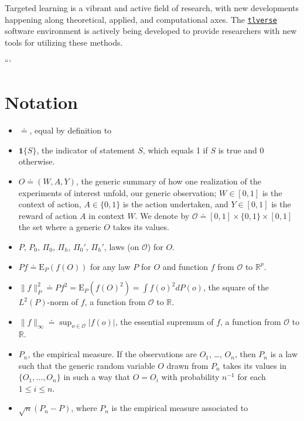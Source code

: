 \documentclass[11pt,openright,twoside]{book}
\newcommand{\bbR}{\mathbb{R}}
\newcommand{\defq}{\doteq}
\newcommand{\calO}{\mathcal{O}}
\newcommand{\Exp}{\textrm{E}}
\newcommand{\one}{\textbf{1}}
\theoremstyle{definition}
\theoremstyle{definition}
\theoremstyle{definition}
\theoremstyle{remark}
\begin{document}
Targeted learning is a vibrant and active field of research, with new
developments happening along theoretical, applied, and computational axes. The
\href{https://tlverse.org/}{\texttt{tlverse}} software environment is actively being
developed to provide researchers with new tools for utilizing these methods.

\hypertarget{appendix-appendix}{%
\appendix}


```

\hypertarget{notation}{%
\chapter{Notation}\label{notation}}

\begin{itemize}
\item
  \(\defq\), equal by definition to
\item
  \(\one\{S\}\), the indicator of statement \(S\), which equals 1 if \(S\) is true
  and 0 otherwise.
\item
  \(O \defq (W,A,Y)\), the generic summary of how one realization of the experiments
  of interest unfold, our generic observation; \(W \in [0,1]\) is the context of
  action, \(A \in \{0,1\}\) is the action undertaken, and \(Y\in [0,1]\) is the
  reward of action \(A\) in context \(W\). We denote by \(\calO \defq [0,1] \times \{0,1\} \times [0,1]\) the set where a generic \(O\) takes its values.
\item
  \(P\), \(P_{0}\), \(\Pi_{0}\), \(\Pi_{h}\), \(\Pi_{0}'\), \(\Pi_{h}'\), laws (on \(\calO\))
  for \(O\).
\item
  \(Pf \defq \Exp_{P} (f(O))\) for any law \(P\) for \(O\) and function \(f\) from
  \(\calO\) to \(\bbR^{p}\).
\item
  \(\|f\|_{P}^{2} \defq Pf^{2} = \Exp_{P} (f(O)^{2}) = \int f(o)^{2} dP(o)\),
  the square of the \(L^{2}(P)\)-norm of \(f\), a function from \(\calO\) to \(\bbR\).
\item
  \(\|f\|_{\infty} \defq \sup_{o \in \calO} |f(o)|\), the essential supremum of
  \(f\), a function from \(\calO\) to \(\bbR\).
\item
  \(P_{n}\), the empirical measure. If the observations are \(O_{1}\), \ldots,
  \(O_{n}\), then \(P_{n}\) is a law such that the generic random variable \(O\) drawn
  from \(P_{n}\) takes its values in \(\{O_{1}, \ldots, O_{n}\}\) in such a way that
  \(O = O_{i}\) with probability \(n^{-1}\) for each \(1 \leq i \leq n\).
\item
  \(\sqrt{n} (P_{n} - P)\), where \(P_{n}\) is the empirical measure associated to

\end{itemize}
\end{document}
